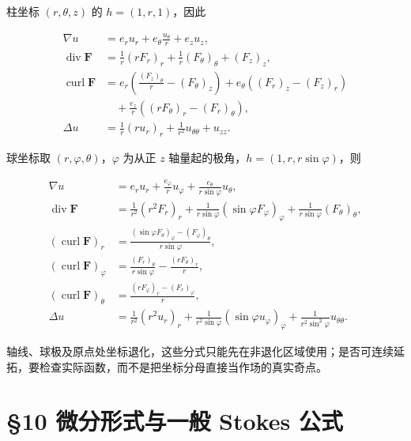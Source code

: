 \documentclass[11pt,a4paper]{article}
\begin{document}
柱坐标 \((r,\theta,z)\) 的 \(h=(1,r,1)\)，因此

\begin{equation*}
\begin{aligned}
 \nabla u&=e_ru_r+e_\theta\frac{u_\theta}{r}+e_zu_z,\\
 \operatorname{div}\mathbf F&=\frac1r(rF_r)_r+\frac1r(F_\theta)_\theta+(F_z)_z,\\
 \operatorname{curl}\mathbf F
 &=e_r\left(\frac{(F_z)_\theta}{r}-(F_\theta)_z\right)
 +e_\theta\left((F_r)_z-(F_z)_r\right)\\
 &\quad+\frac{e_z}{r}\left((rF_\theta)_r-(F_r)_\theta\right),\\
 \Delta u&=\frac1r(ru_r)_r+\frac1{r^2}u_{\theta\theta}+u_{zz}.
\end{aligned}\tag{9.13}
\end{equation*}

球坐标取 \((r,\varphi,\theta)\)，\(\varphi\) 为从正 \(z\)
轴量起的极角，\(h=(1,r,r\sin\varphi)\)，则

\begin{equation*}
\begin{aligned}
 \nabla u&=e_ru_r+\frac{e_\varphi}{r}u_\varphi+
                    \frac{e_\theta}{r\sin\varphi}u_\theta,\\
 \operatorname{div}\mathbf F
 &=\frac1{r^2}(r^2F_r)_r+\frac1{r\sin\varphi}(\sin\varphi F_\varphi)_\varphi
     +\frac1{r\sin\varphi}(F_\theta)_\theta,\\
 (\operatorname{curl}\mathbf F)_r
 &=\frac{(\sin\varphi F_\theta)_\varphi-(F_\varphi)_\theta}{r\sin\varphi},\\
 (\operatorname{curl}\mathbf F)_\varphi
 &=\frac{(F_r)_\theta}{r\sin\varphi}-\frac{(rF_\theta)_r}{r},\\
 (\operatorname{curl}\mathbf F)_\theta
 &=\frac{(rF_\varphi)_r-(F_r)_\varphi}{r},\\
 \Delta u&=\frac1{r^2}(r^2u_r)_r+
 \frac1{r^2\sin\varphi}(\sin\varphi u_\varphi)_\varphi
 +\frac1{r^2\sin^2\varphi}u_{\theta\theta}.
\end{aligned}\tag{9.14}
\end{equation*}

轴线、球极及原点处坐标退化，这些分式只能先在非退化区域使用；是否可连续延拓，要检查实际函数，而不是把坐标分母直接当作场的真实奇点。

\section{§10 微分形式与一般 Stokes
公式}\label{ux5faeux5206ux5f62ux5f0fux4e0eux4e00ux822c-stokes-ux516cux5f0f}
\end{document}
